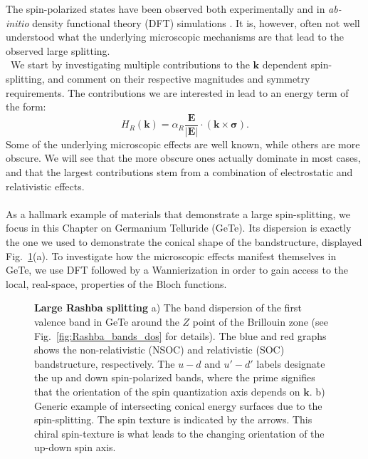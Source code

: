 The spin-polarized states have been observed both experimentally \cite{Ishizaka2011,Liebmann2016,Krempasky2015} and in {\it ab-initio} density functional theory (DFT) simulations \cite{DiSante2013, Kim2014, Picozzi2014}.
It is, however, often not well understood what the underlying microscopic mechanisms are that lead to the observed large splitting.
\\\
We start by investigating multiple contributions to the $\bm{k}$ dependent spin-splitting, and comment on their respective magnitudes and symmetry requirements. 
The contributions we are interested in lead to an energy term of the form:
\begin{equation}
	\label{eq:Rashba_form}
	H_R(\bm{k}) = \alpha_R \frac{\bm{E}}{|\bm{E}|} \cdot (\bm{k} \times \bm{\sigma}).
\end{equation}
Some of the underlying microscopic effects are well known, while others are more obscure.
We will see that the more obscure ones actually dominate in most cases, and that the largest contributions stem from a combination of electrostatic and relativistic effects.
\\\\
As a hallmark example of materials that demonstrate a large spin-splitting, we focus in this Chapter on Germanium Telluride (GeTe).
Its dispersion is exactly the one we used to demonstrate the conical shape of the bandstructure, displayed Fig.~\ref{fig:Rashba_intro_dispersion}(a).
To investigate how the microscopic effects manifest themselves in GeTe, we use DFT followed by a Wannierization in order to gain access to the local, real-space, properties of the Bloch functions.
\begin{figure}[h]
	\caption{\label{fig:Rashba_intro_dispersion}
		{\bf Large Rashba splitting} a) The band dispersion of the first valence band in GeTe around the $Z$ point of the Brillouin zone (see Fig.~\ref{fig:Rashba_bands_dos} for details). The blue and red graphs shows the non-relativistic (NSOC) and relativistic (SOC) bandstructure, respectively. The $u-d$ and $u'-d'$ labels designate the up and down spin-polarized bands, where the prime signifies that the orientation of the spin quantization axis depends on $\bm{k}$. b) Generic example of intersecting conical energy surfaces due to the spin-splitting. The spin texture is indicated by the arrows. This chiral spin-texture is what leads to the changing orientation of the up-down spin axis.}
\end{figure}

